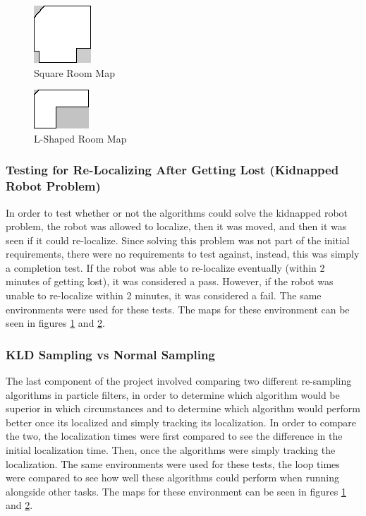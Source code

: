 \documentclass{article}
\newcommand\tab[1][0.5cm]{\hspace*{#1}}
\begin{document}
\begin{figure}[h!]
\centering
\includegraphics[scale=2.0]{roomImprovedTestAdv2.png}
\caption{Square Room Map}
\label{fig:square_room}
\end{figure}

\begin{figure}[h!]
\centering
\includegraphics[scale=3.0]{Map.png}
\caption{L-Shaped Room Map}
\label{fig:l_room}
\end{figure}

\subsubsection{Testing for Re-Localizing After Getting Lost (Kidnapped Robot Problem)}
\tab In order to test whether or not the algorithms could solve the kidnapped robot problem, the robot was allowed to localize, then it was moved, and then it was seen if it could re-localize. Since solving this problem was not part of the initial requirements, there were no requirements to test against, instead, this was simply a completion test. If the robot was able to re-localize eventually (within 2 minutes of getting lost), it was considered a pass. However, if the robot was unable to re-localize within 2 minutes, it was considered a fail. The same environments were used for these tests. The maps for these environment can be seen in figures \ref{fig:square_room} and \ref{fig:l_room}.  

\subsubsection{KLD Sampling vs Normal Sampling}
\tab The last component of the project involved comparing two different re-sampling algorithms in particle filters, in order to determine which algorithm would be superior in which circumstances and to determine which algorithm would perform better once its localized and simply tracking its localization. In order to compare the two, the localization times were first compared to see the difference in the initial localization time. Then, once the algorithms were simply tracking the localization. The same environments were used for these tests, the loop times were compared to see how well these algorithms could perform when running alongside other tasks. The maps for these environment can be seen in figures \ref{fig:square_room} and \ref{fig:l_room}.  
\end{document}
